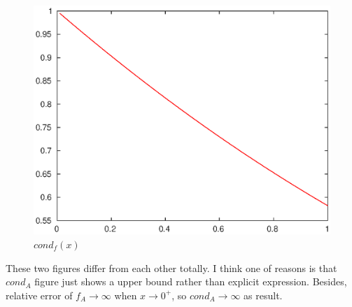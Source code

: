 \documentclass[twoside,a4paper]{article}
\begin{document}
\begin{figure}[H]
\includegraphics[width=5in]{./figure/condf.eps}
\caption{$cond_f(x)$}
\end{figure}
These two figures differ from each other totally. I think one of reasons is that $cond_A$ figure just shows a upper bound rather than explicit expression. Besides, relative error of $f_A\to\infty$ when $x\to0^+$, so $cond_A\to\infty$ as result.
\end{document}
